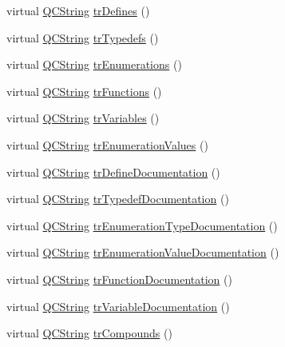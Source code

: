 \begin{DoxyCompactItemize}
\item 
virtual \mbox{\hyperlink{class_q_c_string}{Q\+C\+String}} \mbox{\hyperlink{class_translator_arabic_a94a8e0d1f335193616003f21b5a68c20}{tr\+Defines}} ()
\item 
virtual \mbox{\hyperlink{class_q_c_string}{Q\+C\+String}} \mbox{\hyperlink{class_translator_arabic_a30fbc478e83497bb46e33374a3407b64}{tr\+Typedefs}} ()
\item 
virtual \mbox{\hyperlink{class_q_c_string}{Q\+C\+String}} \mbox{\hyperlink{class_translator_arabic_a326d79ef3895d320d904752ab72b48a2}{tr\+Enumerations}} ()
\item 
virtual \mbox{\hyperlink{class_q_c_string}{Q\+C\+String}} \mbox{\hyperlink{class_translator_arabic_abb708c38af7bc9684a7a43ef5656c141}{tr\+Functions}} ()
\item 
virtual \mbox{\hyperlink{class_q_c_string}{Q\+C\+String}} \mbox{\hyperlink{class_translator_arabic_a621dbf463cf8716cc73199fdebe67376}{tr\+Variables}} ()
\item 
virtual \mbox{\hyperlink{class_q_c_string}{Q\+C\+String}} \mbox{\hyperlink{class_translator_arabic_ab18ed450a4ac10051ca9dbcda44ffb99}{tr\+Enumeration\+Values}} ()
\item 
virtual \mbox{\hyperlink{class_q_c_string}{Q\+C\+String}} \mbox{\hyperlink{class_translator_arabic_aa367047c22e78f701ae4e151a57983ab}{tr\+Define\+Documentation}} ()
\item 
virtual \mbox{\hyperlink{class_q_c_string}{Q\+C\+String}} \mbox{\hyperlink{class_translator_arabic_a8dcda8ec8d47583d94567a48154cdcf0}{tr\+Typedef\+Documentation}} ()
\item 
virtual \mbox{\hyperlink{class_q_c_string}{Q\+C\+String}} \mbox{\hyperlink{class_translator_arabic_a098c2c8b18b1c2d449f08dd1b67f27c4}{tr\+Enumeration\+Type\+Documentation}} ()
\item 
virtual \mbox{\hyperlink{class_q_c_string}{Q\+C\+String}} \mbox{\hyperlink{class_translator_arabic_ad8811a0183622b8db263162e4b9e8094}{tr\+Enumeration\+Value\+Documentation}} ()
\item 
virtual \mbox{\hyperlink{class_q_c_string}{Q\+C\+String}} \mbox{\hyperlink{class_translator_arabic_a97ffd13d19b3b5d0e0dfdf8a4af2928e}{tr\+Function\+Documentation}} ()
\item 
virtual \mbox{\hyperlink{class_q_c_string}{Q\+C\+String}} \mbox{\hyperlink{class_translator_arabic_a2c30e187e8c3b7c9fb36b8e81052907f}{tr\+Variable\+Documentation}} ()
\item 
virtual \mbox{\hyperlink{class_q_c_string}{Q\+C\+String}} \mbox{\hyperlink{class_translator_arabic_a08ecec2f5aa2069025984ad039b594bd}{tr\+Compounds}} ()

\end{DoxyCompactItemize}
